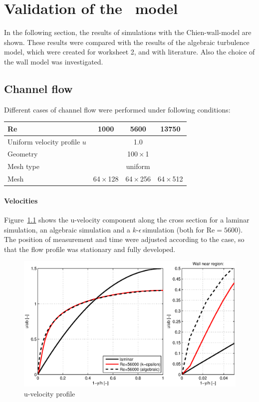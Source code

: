 \chapter{Validation of the \ke\, model} %
\label{cha:validation_of_k_epsilon_model}

In the following section, the results of simulations with the Chien-wall-model are shown. These results were compared with the results of the algebraic turbulence model, which were created for worksheet 2, and with literature. Also the choice of the wall model was investigated.

\section{Channel flow} %
\label{sec:channel_flow}

Different cases of channel flow were performed under following conditions:

\begin{center}
\begin{tabular}{lccc}
\hline 
Re        & 1000 & 5600 & 13750\\\hline         
Uniform velocity profile $u$         & \multicolumn{3}{c}{1.0}\\
Geometry  & \multicolumn{3}{c}{100\,$\times$\,1} \\
Mesh type & \multicolumn{3}{c}{uniform} \\
Mesh      & 64\,$\times$\,128 & 64\,$\times$\,256 & 64\,$\times$\,512 \\\hline 
\end{tabular}
\end{center}

\subsubsection*{Velocities}

Figure~\ref{fig:channel-u-profile} shows the u-velocity component along the cross section for a laminar simulation, an algebraic simulation and a $k$-$\epsilon$\,simulation (both for Re$=5600$). The position of measurement and time were adjusted according to the case, so that the flow profile was stationary and fully developed.

\begin{figure}[!htb]
\centering
\includegraphics[width=1.0\textwidth]{FIGURES/vprofile.eps}
\caption{u-velocity profile}
\label{fig:channel-u-profile}
\end{figure} 


